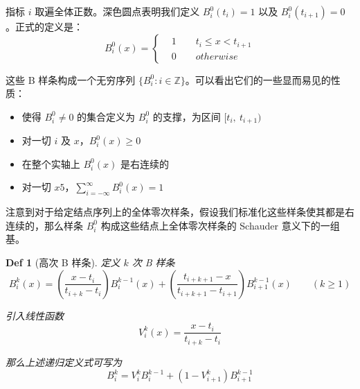 \documentclass[a4paper]{article}
\newtheorem*{definition}{Def}
\begin{document}
    \noindent 指标 $i$ 取遍全体正数。深色圆点表明我们定义 $B_i^0(t_{i}) = 1$ 以及 $B_i^0(t_{i+1}) = 0$。正式的定义是：
    \begin{equation}
        \label{definition-0-B-Spline}
        B_i^0(x) = \left\{\begin{aligned}
            &1 \qquad t_{i} \leqslant x < t_{i+1} \\
            &0 \qquad otherwise
      \end{aligned}\right.
    \end{equation}

    这些 B 样条构成一个无穷序列 $\{B_i^0:i\in \mathbb{Z}\}$。可以看出它们的一些显而易见的性质：
    \begin{itemize}
        \item 使得 $B_i^0 \neq 0$ 的集合定义为 $B_i^0$ 的支撑，为区间 $[t_{i},\ t_{i+1})$
        \item 对一切 $i$ 及 $x$，$B_i^0(x) \geqslant 0$
        \item 在整个实轴上 $B_i^0(x)$ 是右连续的
        \item 对一切 $x5$，$\displaystyle\sum_{i = -\infty}^{\infty} B_i^0(x) = 1$
    \end{itemize}

    注意到对于给定结点序列上的全体零次样条，假设我们标准化这些样条使其都是右连续的，那么样条 $B_i^0$ 构成这些结点上全体零次样条的 Schauder 意义下的一组基。
    
    \begin{definition}[高次 B 样条]
        定义 $k$ 次 B 样条
        \begin{equation}
            B_i^k (x) = \left(\frac{x - t_i}{t_{i+k} - t_{i}}\right) B_{i}^{k-1}(x) + \left(\frac{t_{i+k+1} - x}{t_{i+k+1} - t_{i+1}}\right) B_{i+1}^{k-1}(x) \qquad (k \geqslant 1)
        \end{equation}

        \noindent 引入线性函数
        \begin{equation}
            V_i^k (x) = \frac{x - t_i}{t_{i+k} - t_{i}}
        \end{equation}

        \noindent 那么上述递归定义式可写为
        \begin{equation}
            \label{definition-k-B-Spline}
            B_i^k = V_i^k B_{i}^{k-1} + (1 - V_{i+1}^k) B_{i+1}^{k-1}
        \end{equation}
    \end{definition}
\end{document}
